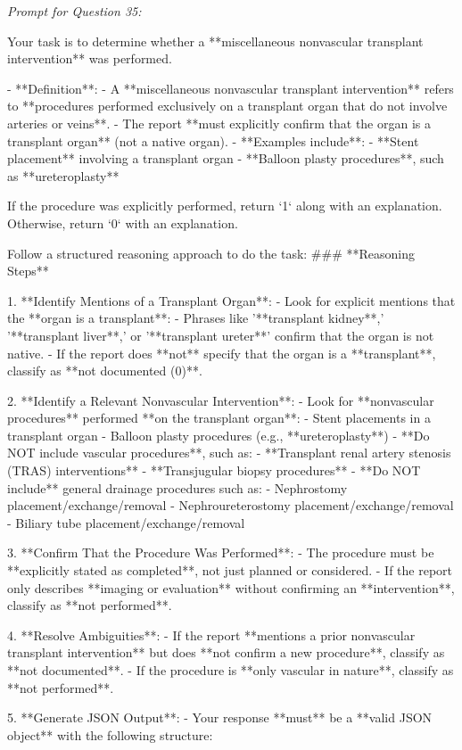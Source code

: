 \textit{\normalsize Prompt for Question  35:}
\begin{mdframed}[]
\normalsize

Your task is to determine whether a **miscellaneous nonvascular transplant intervention** was performed.  

- **Definition**:  
  - A **miscellaneous nonvascular transplant intervention** refers to **procedures performed exclusively on a transplant organ that do not involve arteries or veins**.  
  - The report **must explicitly confirm that the organ is a transplant organ** (not a native organ).  
  - **Examples include**:  
    - **Stent placement** involving a transplant organ  
    - **Balloon plasty procedures**, such as **ureteroplasty**  

If the procedure was explicitly performed, return `1` along with an explanation. Otherwise, return `0` with an explanation.

Follow a structured reasoning approach to do the task:
### **Reasoning Steps**  

1. **Identify Mentions of a Transplant Organ**:  
   - Look for explicit mentions that the **organ is a transplant**:  
     - Phrases like '**transplant kidney**,' '**transplant liver**,' or '**transplant ureter**' confirm that the organ is not native.  
   - If the report does **not** specify that the organ is a **transplant**, classify as **not documented (0)**.  

2. **Identify a Relevant Nonvascular Intervention**:  
   - Look for **nonvascular procedures** performed **on the transplant organ**:  
     - Stent placements in a transplant organ  
     - Balloon plasty procedures (e.g., **ureteroplasty**)  
   - **Do NOT include vascular procedures**, such as:  
     - **Transplant renal artery stenosis (TRAS) interventions**  
     - **Transjugular biopsy procedures**  
   - **Do NOT include** general drainage procedures such as:  
     - Nephrostomy placement/exchange/removal  
     - Nephroureterostomy placement/exchange/removal  
     - Biliary tube placement/exchange/removal  

3. **Confirm That the Procedure Was Performed**:  
   - The procedure must be **explicitly stated as completed**, not just planned or considered.  
   - If the report only describes **imaging or evaluation** without confirming an **intervention**, classify as **not performed**.  

4. **Resolve Ambiguities**:  
   - If the report **mentions a prior nonvascular transplant intervention** but does **not confirm a new procedure**, classify as **not documented**.  
   - If the procedure is **only vascular in nature**, classify as **not performed**.  

5. **Generate JSON Output**:  
   - Your response **must** be a **valid JSON object** with the following structure:  

\end{mdframed}

